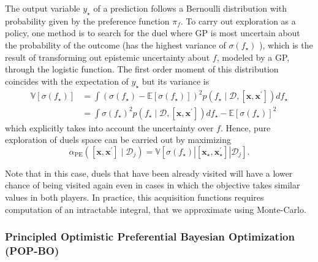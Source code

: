 \documentclass[
  letterpaper,
  DIV=11,
  numbers=noendperiod,
  oneside]{scrreprt}
\theoremstyle{remark}
\begin{document}
The output variable \(y_{\star}\) of a prediction follows a Bernoulli
distribution with probability given by the preference function
\(\pi_f\). To carry out exploration as a policy, one method is to search
for the duel where GP is most uncertain about the probability of the
outcome (has the highest variance of \(\sigma\left(f_{\star}\right)\) ),
which is the result of transforming out epistemic uncertainty about
\(f\), modeled by a GP, through the logistic function. The first order
moment of this distribution coincides with the expectation of
\(y_{\star}\) but its variance is \[\begin{aligned}
\mathbb{V}\left[\sigma\left(f_{\star}\right)\right] & =\int\left(\sigma\left(f_{\star}\right)-\mathbb{E}\left[\sigma\left(f_{\star}\right)\right]\right)^2 p\left(f_{\star} \mid \mathcal{D},\left[\mathbf{x}, \mathbf{x}^{\prime}\right]\right) d f_{\star} \\
& =\int \sigma\left(f_{\star}\right)^2 p\left(f_{\star} \mid \mathcal{D},\left[\mathbf{x}, \mathbf{x}^{\prime}\right]\right) d f_{\star}-\mathbb{E}\left[\sigma\left(f_{\star}\right)\right]^2
\end{aligned}\] which explicitly takes into account the uncertainty over
\(f\). Hence, pure exploration of duels space can be carried out by
maximizing
\[\alpha_{\mathrm{PE}}\left(\left[\mathbf{x}, \mathbf{x}^{\prime}\right] \mid \mathcal{D}_j\right)=\mathbb{V}\left[\sigma\left(f_{\star}\right)\left|\left[\mathbf{x}_{\star}, \mathbf{x}_{\star}^{\prime}\right]\right| \mathcal{D}_j\right] .\]

Note that in this case, duels that have been already visited will have a
lower chance of being visited again even in cases in which the objective
takes similar values in both players. In practice, this acquisition
functions requires computation of an intractable integral, that we
approximate using Monte-Carlo.

\subsubsection*{Principled Optimistic Preferential Bayesian Optimization
(POP-BO)}\label{principled-optimistic-preferential-bayesian-optimization-pop-bo}
\end{document}
